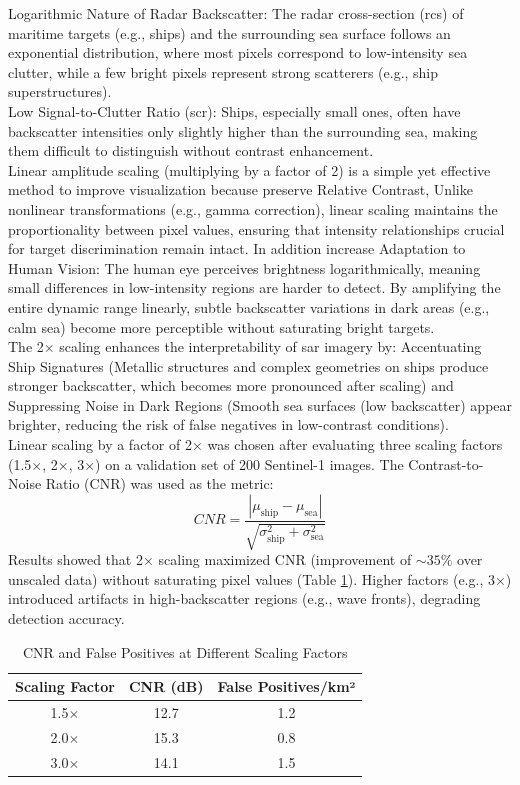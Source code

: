 \documentclass{article}
\begin{document}
Logarithmic Nature of Radar Backscatter: The radar cross-section (\acrshort{rcs}) of maritime targets (e.g., ships) and the surrounding sea surface follows an exponential distribution, where most pixels correspond to low-intensity sea clutter, while a few bright pixels represent strong scatterers (e.g., ship superstructures).\\

Low Signal-to-Clutter Ratio (\acrshort{scr}): Ships, especially small ones, often have backscatter intensities only slightly higher than the surrounding sea, making them difficult to distinguish without contrast enhancement.\\

Linear amplitude scaling (multiplying by a factor of 2) is a simple yet effective method to improve visualization because preserve  Relative Contrast, Unlike nonlinear transformations (e.g., gamma correction), linear scaling maintains the proportionality between pixel values, ensuring that intensity relationships crucial for target discrimination remain intact. In addition increase Adaptation to Human Vision: The human eye perceives brightness logarithmically, meaning small differences in low-intensity regions are harder to detect. By amplifying the entire dynamic range linearly, subtle backscatter variations in dark areas (e.g., calm sea) become more perceptible without saturating bright targets.\\

The 2× scaling enhances the interpretability of \acrshort{sar} imagery by: Accentuating Ship Signatures (Metallic structures and complex geometries on ships produce stronger backscatter, which becomes more pronounced after scaling) and Suppressing Noise in Dark Regions (Smooth sea surfaces (low backscatter) appear brighter, reducing the risk of false negatives in low-contrast conditions).\\

Linear scaling by a factor of 2× was chosen after evaluating three scaling factors (1.5×, 2×, 3×) on a validation set of 200 Sentinel-1 images. The Contrast-to-Noise Ratio (CNR) was used as the metric:
$$CNR = \frac{|\mu_{\text{ship}} - \mu_{\text{sea}}|}{\sqrt{\sigma_{\text{ship}}^2 + \sigma_{\text{sea}}^2}}
$$
Results showed that 2× scaling maximized CNR (improvement of $\sim 35\%$ over unscaled data) without saturating pixel values (Table \ref{tab:cnr_fp}). Higher factors (e.g., 3×) introduced artifacts in high-backscatter regions (e.g., wave fronts), degrading detection accuracy. \begin{table}[h]
\centering
\begin{tabular}{ccc}
\hline
Scaling Factor & CNR (dB) & False Positives/km² \\
\hline
1.5$\times$ & 12.7 & 1.2 \\
2.0$\times$ & 15.3 & 0.8 \\
3.0$\times$ & 14.1 & 1.5 \\
\hline
\end{tabular}
\caption{CNR and False Positives at Different Scaling Factors}
\label{tab:cnr_fp}
\end{table}
\end{document}

